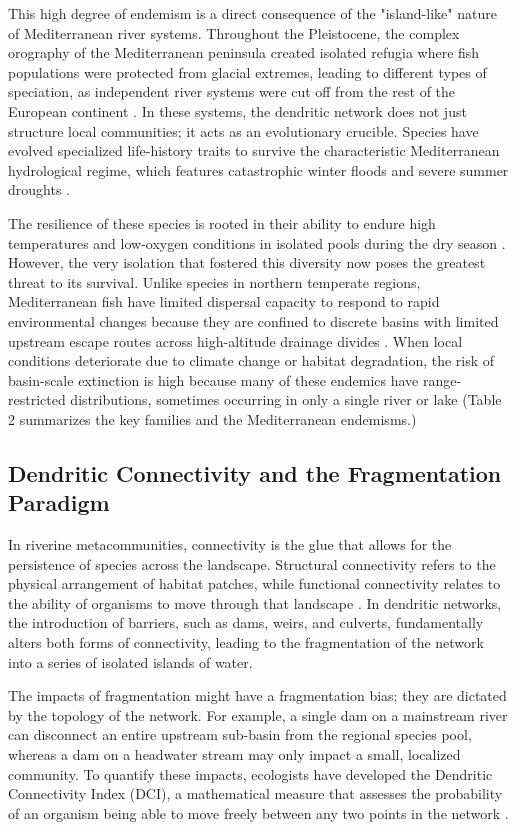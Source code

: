 \documentclass[11pt,a4paper]{article}
\begin{document}
This high degree of endemism is a direct consequence of the "island-like" nature of Mediterranean river systems. Throughout the Pleistocene, the complex orography of the Mediterranean peninsula created isolated refugia where fish populations were protected from glacial extremes, leading to different types of speciation, as independent river systems were cut off from the rest of the European continent \cite{Tsirintanis2021}. In these systems, the dendritic network does not just structure local communities; it acts as an evolutionary crucible. Species have evolved specialized life-history traits to survive the characteristic Mediterranean hydrological regime, which features catastrophic winter floods and severe summer droughts \cite{Herrera2022}.

The resilience of these species is rooted in their ability to endure high temperatures and low-oxygen conditions in isolated pools during the dry season \cite{Carosietal2023}. However, the very isolation that fostered this diversity now poses the greatest threat to its survival. Unlike species in northern temperate regions, Mediterranean fish have limited dispersal capacity to respond to rapid environmental changes because they are confined to discrete basins with limited upstream escape routes across high-altitude drainage divides \cite{DeMiguel2014}. When local conditions deteriorate due to climate change or habitat degradation, the risk of basin-scale extinction is high because many of these endemics have range-restricted distributions, sometimes occurring in only a single river or lake \cite{DeMiguel2014} (Table 2 summarizes the key families and the Mediterranean endemisms.)

\subsection{Dendritic Connectivity and the Fragmentation Paradigm}
In riverine metacommunities, connectivity is the glue that allows for the persistence of species across the landscape. Structural connectivity refers to the physical arrangement of habitat patches, while functional connectivity relates to the ability of organisms to move through that landscape \cite{PerkinGido2012}. In dendritic networks, the introduction of barriers, such as dams, weirs, and culverts, fundamentally alters both forms of connectivity, leading to the fragmentation of the network into a series of isolated islands of water.

The impacts of fragmentation might have a fragmentation bias; they are dictated by the topology of the network. For example, a single dam on a mainstream river can disconnect an entire upstream sub-basin from the regional species pool, whereas a dam on a headwater stream may only impact a small, localized community. To quantify these impacts, ecologists have developed the Dendritic Connectivity Index (DCI), a mathematical measure that assesses the probability of an organism being able to move freely between any two points in the network \cite{PerkinGido2012}.
\end{document}
